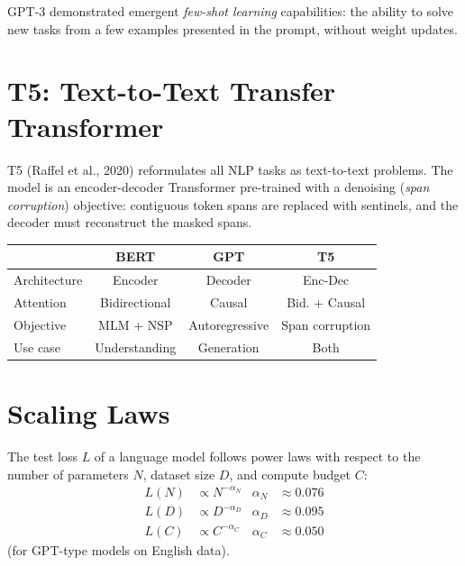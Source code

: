 \begin{remark}
GPT-3 demonstrated emergent \emph{few-shot learning} capabilities: the ability
to solve new tasks from a few examples presented in the prompt, without weight
updates.
\end{remark}

\section{T5: Text-to-Text Transfer Transformer}
\label{sec:pre:t5}

\begin{definition}[T5]
T5 (Raffel et al., 2020) reformulates all NLP tasks as text-to-text problems.
The model is an encoder-decoder Transformer pre-trained with a denoising
(\emph{span corruption}) objective: contiguous token spans are replaced with
sentinels, and the decoder must reconstruct the masked spans.
\end{definition}

\begin{keyformulas}[title=\textbf{Architecture comparison}]
\begin{center}
\begin{tabular}{lccc}
\toprule
& \textbf{BERT} & \textbf{GPT} & \textbf{T5} \\
\midrule
Architecture & Encoder & Decoder & Enc-Dec \\
Attention & Bidirectional & Causal & Bid. + Causal \\
Objective & MLM + NSP & Autoregressive & Span corruption \\
Use case & Understanding & Generation & Both \\
\bottomrule
\end{tabular}
\end{center}
\end{keyformulas}

\section{Scaling Laws}
\label{sec:pre:scaling}

\begin{theorem}
The test loss $L$ of a language model follows power laws with respect to the
number of parameters $N$, dataset size $D$, and compute budget $C$:
\begin{align}
L(N) &\propto N^{-\alpha_N} & \alpha_N &\approx 0.076 \\
L(D) &\propto D^{-\alpha_D} & \alpha_D &\approx 0.095 \\
L(C) &\propto C^{-\alpha_C} & \alpha_C &\approx 0.050
\end{align}
(for GPT-type models on English data).
\end{theorem}

